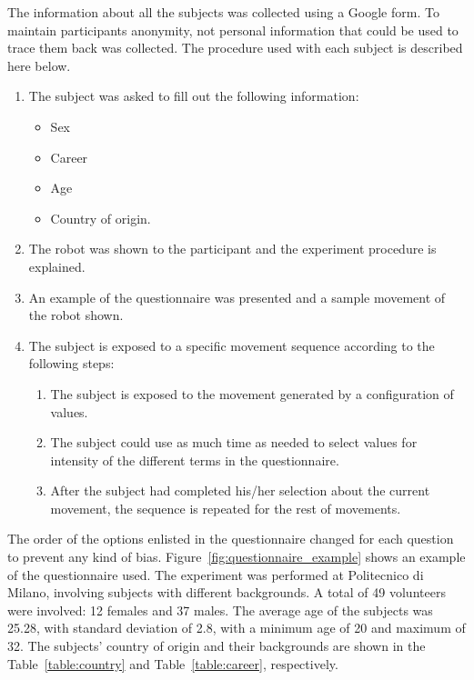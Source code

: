 
The information about all the subjects was collected using a Google form. To maintain participants anonymity, not personal information that could be used to trace them back was collected. The procedure used with each subject is described here below.

\begin{enumerate}
	
	\item The subject was asked to fill out the following information:
	
	\begin{itemize}
		\item Sex
		\item Career
		\item Age
		\item Country of origin.
	\end{itemize}
	
	\item The robot was shown to the participant and the experiment procedure is explained.

	\item An example of the questionnaire was presented and a sample movement of the robot shown.

	\item The subject is exposed to a specific movement sequence according to the following steps:

	\begin{enumerate}

		\item The subject is exposed to the movement generated by a configuration of values.

		\item The subject could use as much time as needed to select values for intensity of the different terms in the questionnaire.

		\item After the subject had completed his/her selection about the current movement, the sequence is repeated for the rest of movements.

	\end{enumerate}
\end{enumerate}

The order of the options enlisted in the questionnaire changed for each question to prevent any kind of bias. Figure~\ref{fig:questionnaire_example} shows an example of the questionnaire used. The experiment was performed at Politecnico di Milano, involving subjects with different backgrounds. %
A total of 49 volunteers were involved: 12 females and 37 males. The average age of the subjects was 25.28, with standard deviation of 2.8, with a minimum age of 20 and maximum of 32. The subjects' country of origin and their backgrounds are shown in the Table~\ref{table:country} and Table~\ref{table:career}, respectively. 

